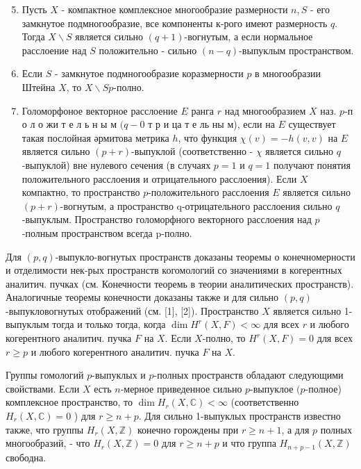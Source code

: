 \documentclass[10pt]{article}
\begin{document}
\begin{enumerate}

  \setcounter{enumi}{4}

  \item Пусть $X$ - компактное комплексное многообразие размерности $n, S$ - его замкнутое подмногообразие, все компоненты к-рого имеют размерность $q$. Тогда $X \backslash S$ является сильно $(q+1)$-вогнутым, а если нормальное расслоение над $S$ положительно - сильно $(n-q)$-выпуклым пространством.



  \item Если $S$ - замкнутое подмногообразие коразмерности $p$ в многообразии Штейна $X$, то $X \backslash S p$-полно.



  \item Голоморфоное векторное расслоение $E$ ранга $r$ над многообразием $X$ наз. $p$-п о л о жи т е л ь н ы м $(q-0$ т р и ца т е ль ны м), если на $E$ существует такая послойная әрмитова метрика $h$, что функция $\chi(v)=-h(v, v)$ на $E$ является сильно $(p+r)$-выпуклой (соответственно - $\chi$ является сильно $q$-выпуклой) вне нулевого сечения (в случаях $p=1$ и $q=1$ получают понятия положительного расслоения и отрицательного расслоения). Если $X$ компактно, то пространство $p$-положительного расслоения $E$ является сильно $(p+r)$-вогнутым, а пространство q-отрицательного расслоения сильно $q$-выпуклым. Пространство голоморфного векторного расслоения над $p$-полным пространством всегда p-полно.



\end{enumerate}



Для $(p, q)$-выпукло-вогнутых пространств доказаны теоремы о конечномерности и отделимости нек-рых пространств когомологий со значениями в когерентных аналитич. пучках (см. Конечности теоремь в теории аналитических пространств). Аналогичные теоремы конечности доказаны также и для сильно $(p, q)$-выпукловогнутых отображений (см. [1], [2]). Пространство $X$ является сильно 1-выпуклым тогда и только тогда, когда $\operatorname{dim} H^{r}(X, F)<\infty$ для всех $r$ и любого когерентного аналитич. пучка $F$ на $X$. Если $X$-полно, то $H^{r}(X, F)=0$ для всех $r \geqslant p$ и любого когерентного аналитич. пучка $F$ на $X$.



Группы гомологий $p$-выпуклых и $p$-полных пространств обладают следующими свойствами. Если $X$ есть $n$-мерное приведенное сильно $p$-выпуклое $(p$-полное) комплексное пространство, то $\operatorname{dim} H_{r}(X, \mathbb{C})<\infty$ (соответственно $H_{r}(X, \mathbb{C})=0$ ) для $r \geqslant n+p$. Для сильно 1-выпуклых пространств известно также, что группы $H_{r}(X, \mathbb{Z})$ конечно горождены при $r \geqslant n+1$, а для $p$ полных многообразий, - что $H_{r}(X, \mathbb{Z})=0$ для $r \geqslant n+p$ и что группа $H_{n+p-1}(X, \mathbb{Z})$ свободна.
\end{document}
